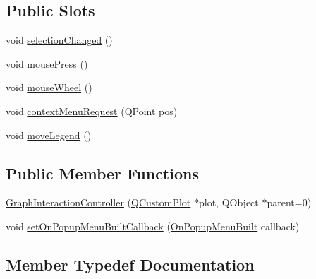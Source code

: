 \subsection*{Public Slots}
\begin{DoxyCompactItemize}
\item 
void \mbox{\hyperlink{class_graph_interaction_controller_a74523456d82060bb6133761497dfbeb3}{selection\+Changed}} ()
\item 
void \mbox{\hyperlink{class_graph_interaction_controller_a1f1cddbde187c45600237a46d1e14164}{mouse\+Press}} ()
\item 
void \mbox{\hyperlink{class_graph_interaction_controller_ab1e4a0eb7f63ded4c86b6c7e4b79c80a}{mouse\+Wheel}} ()
\item 
void \mbox{\hyperlink{class_graph_interaction_controller_a8837750ec2c9a8c3f40179ee68c602aa}{context\+Menu\+Request}} (Q\+Point pos)
\item 
void \mbox{\hyperlink{class_graph_interaction_controller_a7e64e84b708da10d07b68cbe2ab2dfb1}{move\+Legend}} ()
\end{DoxyCompactItemize}
\subsection*{Public Member Functions}
\begin{DoxyCompactItemize}
\item 
\mbox{\hyperlink{class_graph_interaction_controller_ae406f19a6cbcea61bdb1927af19f2823}{Graph\+Interaction\+Controller}} (\mbox{\hyperlink{class_q_custom_plot}{Q\+Custom\+Plot}} $\ast$plot, Q\+Object $\ast$parent=0)
\item 
void \mbox{\hyperlink{class_graph_interaction_controller_a4d5f8af2f6c20647d6320efe5487f5a6}{set\+On\+Popup\+Menu\+Built\+Callback}} (\mbox{\hyperlink{class_graph_interaction_controller_a9781ca3edf7c9c5cf3ad12c3496cf24c}{On\+Popup\+Menu\+Built}} callback)
\end{DoxyCompactItemize}


\subsection{Member Typedef Documentation}
\mbox{\label{class_graph_interaction_controller_a9781ca3edf7c9c5cf3ad12c3496cf24c}} 
